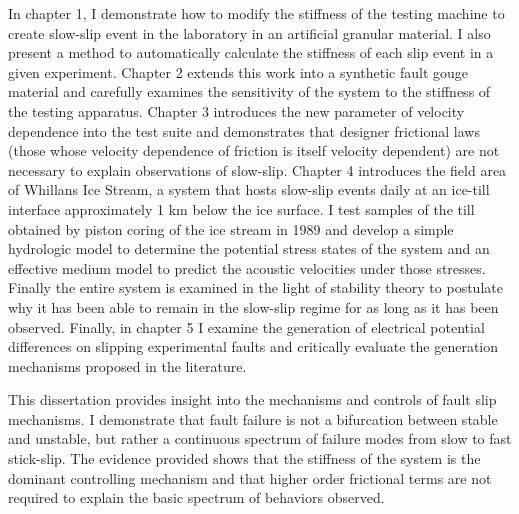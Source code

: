 \documentclass[11pt]{psuthesis}
\begin{document}
\begin{frontmatter}
In chapter 1, I demonstrate how to modify the stiffness of the testing machine to create slow-slip event in the laboratory in an artificial granular material. I also present a method to automatically calculate the stiffness of each slip event in a given experiment. Chapter 2 extends this work into a synthetic fault gouge material and carefully examines the sensitivity of the system to the stiffness of the testing apparatus. Chapter 3 introduces the new parameter of velocity dependence into the test suite and demonstrates that designer frictional laws (those whose velocity dependence of friction is itself velocity dependent) are not necessary to explain observations of slow-slip. Chapter 4 introduces the field area of Whillans Ice Stream, a system that hosts slow-slip events daily at an ice-till interface approximately 1 km below the ice surface. I test samples of the till obtained by piston coring of the ice stream in 1989 and develop a simple hydrologic model to determine the potential stress states of the system and an effective medium model to predict the acoustic velocities under those stresses. Finally the entire system is examined in the light of stability theory to postulate why it has been able to remain in the slow-slip regime for as long as it has been observed. Finally, in chapter 5 I examine the generation of electrical potential differences on slipping experimental faults and critically evaluate the generation mechanisms proposed in the literature.

This dissertation provides insight into the mechanisms and controls of fault slip mechanisms. I demonstrate that fault failure is not a bifurcation between stable and unstable, but rather a continuous spectrum of failure modes from slow to fast stick-slip. The evidence provided shows that the stiffness of the system is the dominant controlling mechanism and that higher order frictional terms are not required to explain the basic spectrum of behaviors observed.




\tables



\end{frontmatter}
\end{document}

